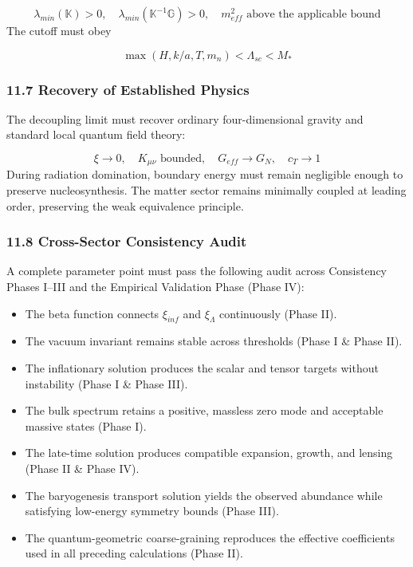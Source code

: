 \documentclass[aps,prd,onecolumn,superscriptaddress,nofootinbib,longbibliography,10pt]{revtex4-2}
\begin{document}
  \[ \lambda_{min}(\mathbb{K}) > 0, \quad \lambda_{min}(\mathbb{K}^{-1}\mathbb{G}) > 0, \quad m_{eff}^2\text{ above the applicable bound} \]
  The cutoff must obey


  \[ \max(H, k/a, T, m_n) < \Lambda_{sc} < M_* \]

  
\subsubsection*{11.7 Recovery of Established Physics}

  The decoupling limit must recover ordinary four-dimensional gravity and standard local quantum field theory:


  \[ \xi \to 0, \quad K_{\mu\nu}\text{ bounded}, \quad G_{eff} \to G_N, \quad c_T \to 1 \]
  During radiation domination, boundary energy must remain negligible enough to preserve nucleosynthesis. The matter sector remains minimally coupled at leading order, preserving the weak equivalence principle.



  
\subsubsection*{11.8 Cross-Sector Consistency Audit}

  A complete parameter point must pass the following audit across Consistency Phases I–III and the Empirical Validation Phase (Phase IV):


  
\begin{itemize}
    
\item The beta function connects \(\xi_{inf}\) and \(\xi_\Lambda\) continuously (Phase II).
    
\item The vacuum invariant remains stable across thresholds (Phase I \& Phase II).
    
\item The inflationary solution produces the scalar and tensor targets without instability (Phase I \& Phase III).
    
\item The bulk spectrum retains a positive, massless zero mode and acceptable massive states (Phase I).
    
\item The late-time solution produces compatible expansion, growth, and lensing (Phase II \& Phase IV).
    
\item The baryogenesis transport solution yields the observed abundance while satisfying low-energy symmetry bounds (Phase III).
    
\item The quantum-geometric coarse-graining reproduces the effective coefficients used in all preceding calculations (Phase II).
  
\end{itemize}
\end{document}
